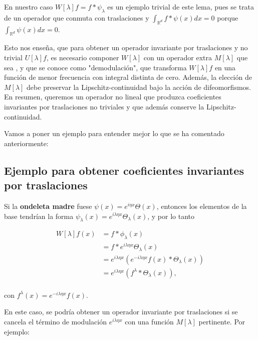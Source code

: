 \noindent En nuestro caso $W[\lambda]f=f\ast\psi_\lambda$ es un ejemplo trivial de este lema, pues se trata de un operador que conmuta con traslaciones y $\int_{\mathbb{R}^d} f \ast \psi(x) dx=0$ porque $\int_{\mathbb{R}^d} \psi(x)dx=0$.

\medskip

\noindent Esto nos enseña, que para obtener un operador invariante por traslaciones y no trivial $U[\lambda]f$, es necesario componer $W[\lambda]$ con un operador extra $M[\lambda]$ que sea , y que se conoce como "demodulación", que transforma $W[\lambda]f$ en una función de menor frecuencia con integral distinta de cero. Además, la elección de $M[\lambda]$ debe preservar la Lipschitz-continuidad bajo la acción de difeomorfismos.    
En resumen, queremos un operador no lineal que produzca coeficientes invariantes por traslaciones no triviales y que además conserve la Lipschitz-continuidad.


\medskip

\noindent Vamos a poner un ejemplo para entender mejor lo que se ha comentado anteriormente: 

\subsection{Ejemplo para obtener coeficientes invariantes por traslaciones}

\noindent Si la \textbf{ondeleta madre} fuese $\psi(x)=e^{i\eta x}\Theta(x)$, entonces los elementos de la base tendrían la forma $\psi_\lambda(x)=e^{i\lambda\eta x}\Theta_\lambda(x)$, y por lo tanto 


\begin{align} \label{eq::1.4}
  W[\lambda]f(x) &= f \ast \phi_\lambda (x) \\
  &= f \ast e^{i\lambda\eta x}\Theta_\lambda(x) \\
  &=e^{i\lambda\eta x}(e^{-i\lambda\eta x}f(x) \ast \Theta_\lambda(x)) \\
  &=e^{i\lambda\eta x}(f^\lambda \ast \Theta_\lambda(x)),\\
\end{align}

\noindent con $f^\lambda(x)=e^{-i\lambda\eta x}f(x)$.

\medskip

\noindent En este caso, se podría obtener un operador invariante por traslaciones si se cancela el término de modulación $e^{i\lambda\eta x}$ con una función $M[\lambda]$ pertinente. Por ejemplo: 

